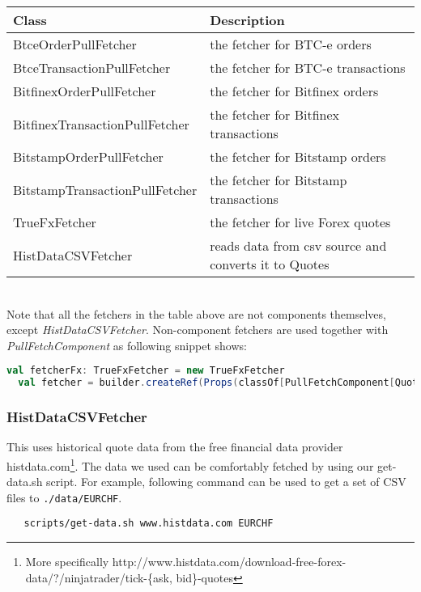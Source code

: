 \noindent
\begin{tabularx}{\textwidth}{|l|X|}
  \hline
  Class & Description  \\
  \hline
  BtceOrderPullFetcher & the fetcher for BTC-e orders \\
  \hline
  BtceTransactionPullFetcher  & the fetcher for BTC-e transactions  \\
  \hline
  BitfinexOrderPullFetcher & the fetcher for Bitfinex orders  \\
  \hline
  BitfinexTransactionPullFetcher & the fetcher for Bitfinex transactions  \\
  \hline
  BitstampOrderPullFetcher & the fetcher for Bitstamp orders  \\
  \hline
  BitstampTransactionPullFetcher & the fetcher for Bitstamp transactions \\
  \hline
  TrueFxFetcher & the fetcher for  live Forex quotes  \\
  \hline
  HistDataCSVFetcher & reads data from csv source and converts it to Quotes \\
  \hline
\end{tabularx}\\[0.3cm]

Note that all the fetchers in the table above are not components themselves, except \emph{HistDataCSVFetcher}. Non-component fetchers are used together with \emph{PullFetchComponent} as following snippet shows:

\begin{lstlisting}[language=Scala]
  val fetcherFx: TrueFxFetcher = new TrueFxFetcher
  val fetcher = builder.createRef(Props(classOf[PullFetchComponent[Quote]], fetcherFx, implicitly[ClassTag[Quote]]), "TrueFxFetcher")
\end{lstlisting}

\subsubsection{HistDataCSVFetcher}

This uses historical quote data from the free financial data provider histdata.com\footnote{More specifically http://www.histdata.com/download-free-forex-data/?/ninjatrader/tick-\{ask, bid\}-quotes}. The data we used can be comfortably fetched by using our get-data.sh script. For example,  following command can be used to get a set of CSV files to  \lstinline|./data/EURCHF|.

\begin{verbatim}
   scripts/get-data.sh www.histdata.com EURCHF
\end{verbatim}

